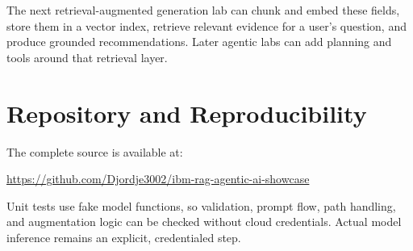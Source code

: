 \documentclass[11pt]{article}
\begin{document}
The next retrieval-augmented generation lab can chunk and embed these fields,
store them in a vector index, retrieve relevant evidence for a user's question,
and produce grounded recommendations. Later agentic labs can add planning and
tools around that retrieval layer.

\section{Repository and Reproducibility}

The complete source is available at:

\begin{center}
\url{https://github.com/Djordje3002/ibm-rag-agentic-ai-showcase}
\end{center}

Unit tests use fake model functions, so validation, prompt flow, path handling,
and augmentation logic can be checked without cloud credentials. Actual model
inference remains an explicit, credentialed step.
\end{document}
